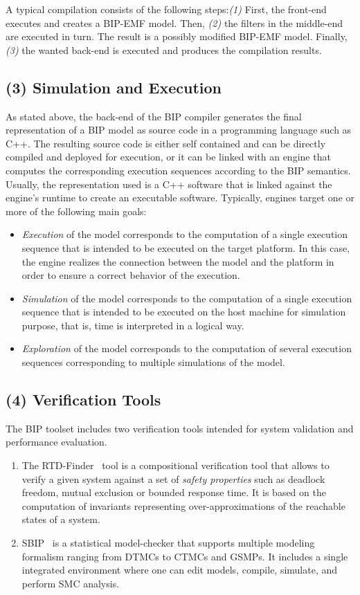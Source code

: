A typical compilation consists of the following steps:\emph{(1)} First, the front-end 
executes and creates a BIP-EMF model. Then, \emph{(2)} the filters in the middle-end are 
executed in turn. The result is a possibly modified BIP-EMF model. Finally, \emph{(3)} 
the wanted back-end is executed and produces the compilation results.


\subsection*{(3) Simulation and Execution}
As stated above, the back-end of the BIP compiler generates the final representation of 
a BIP model as source code in a programming language such as C++. The resulting source code
is either self contained and can be directly compiled and deployed for execution, or it can 
be linked with an engine that computes the corresponding execution sequences according to 
the BIP semantics. Usually, the representation used is a C++ software 
that is linked against the engine’s runtime to create an executable software. Typically, 
engines target one or more of the following main goals:
\begin{itemize}
  \item \emph{Execution} of the model corresponds to the computation of a single execution 
    sequence that is intended to be executed on the target platform. In this case, the engine 
    realizes the connection between the model and the platform in order to ensure a correct 
    behavior of the execution.
  \item \emph{Simulation} of the model corresponds to the computation of a single execution 
    sequence that is intended to be executed on the host machine for simulation purpose, 
    that is, time is interpreted in a logical way.
  \item \emph{Exploration} of the model corresponds to the computation of several 
    execution sequences corresponding to multiple simulations of the model. 
\end{itemize}
 
\subsection*{(4) Verification Tools}

The BIP toolset includes two verification tools intended for system validation and performance
evaluation.

\begin{enumerate}
  \item The RTD-Finder~\cite{rtdf} tool is a compositional verification tool that allows 
    to verify a given
    system against a set of \emph{safety properties} such as deadlock freedom, mutual exclusion
    or bounded response time. It is based on the computation of invariants representing 
    over-approximations of the reachable states of a system.
  \item SBIP~\cite{sbip} is a statistical model-checker that supports multiple modeling 
    formalism ranging from DTMCs to CTMCs and GSMPs. It includes a single integrated 
    environment where one can edit models, compile, simulate, and perform SMC
    analysis. 
\end{enumerate}

